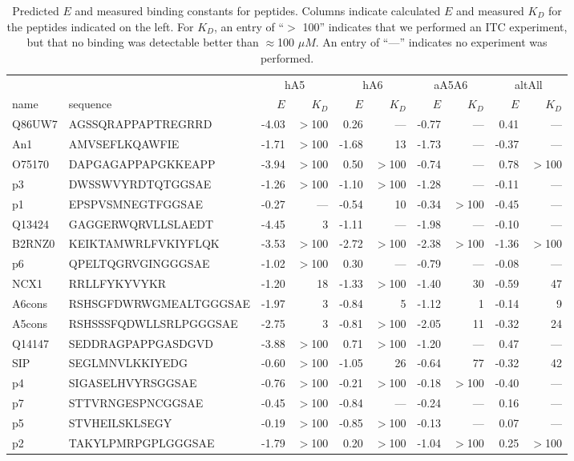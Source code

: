 \begin{table}[h!]\footnotesize %
\caption[Predicted $E$ and
measured binding constants for peptides] {Predicted $E$ and
measured binding constants for peptides. Columns indicate calculated
$E$ and measured $K_{D}$ for the peptides indicated on the left.
For $K_{D}$, an entry of ``$>$ 100'' indicates that we performed
an ITC experiment, but that no binding was detectable better than
$\approx$100 $\mu M$. An entry of ``---'' indicates no experiment
was performed.}
\scriptsize
\begin{tabular}{ll|rr|rr|rr|rr}
 &  & \multicolumn{2}{c|}{hA5} & \multicolumn{2}{c|}{hA6} & \multicolumn{2}{c|}{aA5A6} & \multicolumn{2}{c}{altAll}\tabularnewline
name & sequence & $E$ & $K_{D}$ & $E$ & $K_{D}$ & $E$ & $K_{D}$ & \emph{$E$} & $K_{D}$\tabularnewline
\hline 
Q86UW7 & AGSSQRAPPAPTREGRRD & -4.03 & $>$100 & 0.26 & --- & -0.77 & --- & 0.41 & ---\tabularnewline
An1 & AMVSEFLKQAWFIE & -1.71 & $>$100 & -1.68 & 13 & -1.73 & --- & -0.37 & ---\tabularnewline
O75170 & DAPGAGAPPAPGKKEAPP & -3.94 & $>$100 & 0.50 & $>$100 & -0.74 & --- & 0.78 & $>$100\tabularnewline
p3 & DWSSWVYRDTQTGGSAE & -1.26 & $>$100 & -1.10 & $>$100 & -1.28 & --- & -0.11 & ---\tabularnewline
p1 & EPSPVSMNEGTFGGSAE & -0.27 & --- & -0.54 & 10 & -0.34 & $>$100 & -0.45 & ---\tabularnewline
Q13424 & GAGGERWQRVLLSLAEDT & -4.45 & 3 & -1.11 & --- & -1.98 & --- & -0.10 & ---\tabularnewline
B2RNZ0 & KEIKTAMWRLFVKIYFLQK & -3.53 & $>$100 & -2.72 & $>$100 & -2.38 & $>$100 & -1.36 & $>$100\tabularnewline
p6 & QPELTQGRVGINGGGSAE & -1.02 & $>$100 & 0.30 & --- & -0.79 & --- & -0.08 & ---\tabularnewline
NCX1 & RRLLFYKYVYKR & -1.20 & 18 & -1.33 & $>$100 & -1.40 & 30 & -0.59 & 47\tabularnewline
A6cons & RSHSGFDWRWGMEALTGGGSAE & -1.97 & 3 & -0.84 & 5 & -1.12 & 1 & -0.14 & 9\tabularnewline
A5cons & RSHSSSFQDWLLSRLPGGGSAE & -2.75 & 3 & -0.81 & $>$100 & -2.05 & 11 & -0.32 & 24\tabularnewline
Q14147 & SEDDRAGPAPPGASDGVD & -3.88 & $>$100 & 0.71 & $>$100 & -1.20 & --- & 0.47 & ---\tabularnewline
SIP & SEGLMNVLKKIYEDG & -0.60 & $>$100 & -1.05 & 26 & -0.64 & 77 & -0.32 & 42\tabularnewline
p4 & SIGASELHVYRSGGSAE & -0.76 & $>$100 & -0.21 & $>$100 & -0.18 & $>$100 & -0.40 & ---\tabularnewline
p7 & STTVRNGESPNCGGSAE & -0.45 & $>$100 & -0.84 & --- & -0.24 & --- & 0.16 & ---\tabularnewline
p5 & STVHEILSKLSEGY & -0.19 & $>$100 & -0.85 & $>$100 & -0.13 & --- & 0.07 & ---\tabularnewline
p2 & TAKYLPMRPGPLGGGSAE & -1.79 & $>$100 & 0.20 & $>$100 & -1.04 & $>$100 & 0.25 & $>$100\tabularnewline
\end{tabular}
\end{table}

